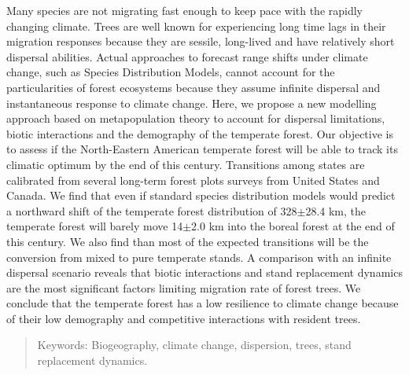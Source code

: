 \abstract
\begin{singlespace}

  Many species are not migrating fast enough to keep pace with the rapidly changing climate. Trees are well known for experiencing long time lags in their migration responses because they are sessile, long-lived and have relatively short dispersal abilities. Actual approaches to forecast range shifts under climate change, such as Species Distribution Models, cannot account for the particularities of forest ecosystems because they assume infinite dispersal and instantaneous response to climate change. Here, we propose a new modelling approach based on metapopulation theory to account for dispersal limitations, biotic interactions and the demography of the temperate forest. Our objective is to assess if the North-Eastern American temperate forest will be able to track its climatic optimum by the end of this century. Transitions among states are calibrated from several long-term forest plots surveys from United States and Canada. We find that even if standard species distribution models would predict a northward shift of the temperate forest distribution of 328$\pm$28.4 km, the temperate forest will barely move 14$\pm$2.0 km into the boreal forest at the end of this century. We also find than most of the expected transitions will be the conversion from mixed to pure temperate stands. A comparison with an infinite dispersal scenario reveals that biotic interactions and stand replacement dynamics are the most significant factors limiting migration rate of forest trees. We conclude that the temperate forest has a low resilience to climate change because of their low demography and competitive interactions with resident trees.

  \begin{quote}
    Keywords: Biogeography, climate change, dispersion, trees, stand replacement dynamics.
  \end{quote}
\end{singlespace}
\cleardoublepage


\tabledesmatieres


\listedestableaux


\listedesfigures



\cleardoublepage
